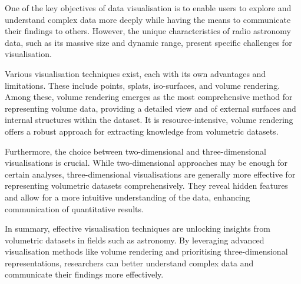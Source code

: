 One of the key objectives of data visualisation is to enable users to explore and understand complex data more deeply while having the means to communicate their findings to others. 
However, the unique characteristics of radio astronomy data, such as its massive size and dynamic range, present specific challenges for visualisation.

Various visualisation techniques exist, each with its own advantages and limitations. 
These include points, splats, iso-surfaces, and volume rendering. 
Among these, volume rendering emerges as the most comprehensive method for representing volume data, providing a detailed view and of external surfaces and internal structures within the dataset. 
It is resource-intensive, volume rendering offers a robust approach for extracting knowledge from volumetric datasets.

Furthermore, the choice between two-dimensional and three-dimensional visualisations is crucial. 
While two-dimensional approaches may be enough for certain analyses, three-dimensional visualisations are generally more effective for representing volumetric datasets comprehensively. 
They reveal hidden features and allow for a more intuitive understanding of the data, enhancing communication of quantitative results.

In summary, effective visualisation techniques are unlocking insights from volumetric datasets in fields such as astronomy. By leveraging advanced visualisation methods like volume rendering and prioritising three-dimensional representations, researchers can better understand complex data and communicate their findings more effectively.

